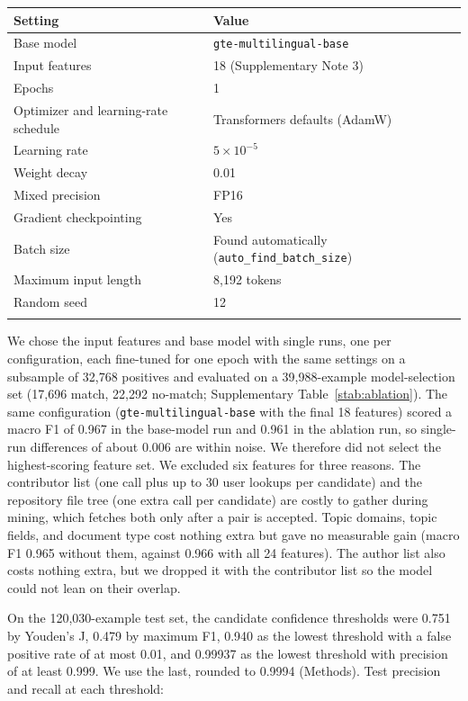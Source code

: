 \documentclass[pdflatex,sn-nature]{sn-jnl}%
\begin{document}
\begin{center}
\footnotesize
\begin{tabular}{@{}ll@{}}
\toprule
Setting & Value \\
\midrule
Base model & \texttt{gte-multilingual-base} \\
Input features & 18 (Supplementary Note 3) \\
Epochs & 1 \\
Optimizer and learning-rate schedule & Transformers defaults (AdamW) \\
Learning rate & $5\times10^{-5}$ \\
Weight decay & 0.01 \\
Mixed precision & FP16 \\
Gradient checkpointing & Yes \\
Batch size & Found automatically (\texttt{auto\_find\_batch\_size}) \\
Maximum input length & 8,192 tokens \\
Random seed & 12 \\
\botrule
\end{tabular}
\end{center}

We chose the input features and base model with single runs, one per configuration, each fine-tuned for one epoch with the same settings on a subsample of 32,768 positives and evaluated on a 39,988-example model-selection set (17,696 match, 22,292 no-match; Supplementary Table~\ref{stab:ablation}).
The same configuration (\texttt{gte-multilingual-base} with the final 18 features) scored a macro F1 of 0.967 in the base-model run and 0.961 in the ablation run, so single-run differences of about 0.006 are within noise.
We therefore did not select the highest-scoring feature set.
We excluded six features for three reasons. The contributor list (one call plus up to 30 user lookups per candidate) and the repository file tree (one extra call per candidate) are costly to gather during mining, which fetches both only after a pair is accepted. Topic domains, topic fields, and document type cost nothing extra but gave no measurable gain (macro F1 0.965 without them, against 0.966 with all 24 features). The author list also costs nothing extra, but we dropped it with the contributor list so the model could not lean on their overlap.

On the 120,030-example test set, the candidate confidence thresholds were 0.751 by Youden's J, 0.479 by maximum F1, 0.940 as the lowest threshold with a false positive rate of at most 0.01, and 0.99937 as the lowest threshold with precision of at least 0.999.
We use the last, rounded to 0.9994 (Methods).
Test precision and recall at each threshold:
\end{document}
